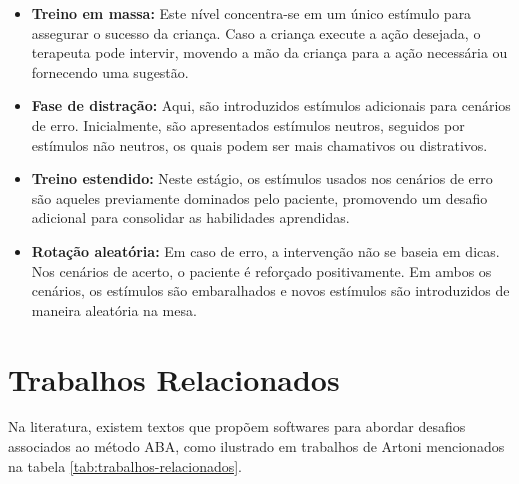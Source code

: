 \begin{itemize}
    \item \textbf{Treino em massa:} 
    Este nível concentra-se em um único estímulo para assegurar o sucesso da criança. 
    Caso a criança execute a ação desejada, o terapeuta pode intervir, 
    movendo a mão da criança para a ação necessária ou fornecendo uma sugestão.
    
    \item \textbf{Fase de distração:} 
    Aqui, são introduzidos estímulos adicionais para cenários de erro. 
    Inicialmente, são apresentados estímulos neutros, 
    seguidos por estímulos não neutros, 
    os quais podem ser mais chamativos ou distrativos.

    \item \textbf{Treino estendido:} 
    Neste estágio, os estímulos usados nos cenários de erro são aqueles previamente dominados pelo paciente, 
    promovendo um desafio adicional para consolidar as habilidades aprendidas.

    \item \textbf{Rotação aleatória:} 
    Em caso de erro, a intervenção não se baseia em dicas. 
    Nos cenários de acerto, o paciente é reforçado positivamente. 
    Em ambos os cenários, os estímulos são embaralhados e novos estímulos são introduzidos de maneira aleatória na mesa.
\end{itemize}

\section{Trabalhos Relacionados}

Na literatura, existem textos que propõem softwares para abordar desafios associados ao método ABA, 
como ilustrado em trabalhos de Artoni mencionados na tabela \ref{tab:trabalhos-relacionados}.

